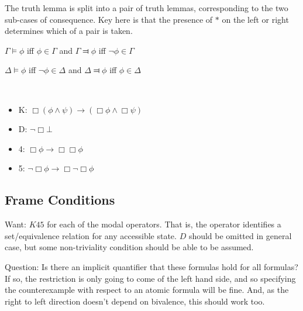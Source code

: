 \documentclass[10pt]{article}
\begin{document}
The truth lemma is split into a pair of truth lemmas, corresponding to the two sub-cases of consequence.
Key here is that the presence of \(\ast\) on the left or right determines which of a pair is taken.



\begin{lemma}
  \(\Gamma \vDash \phi\) iff \(\phi \in \Gamma\) and \(\Gamma \Dashv \phi\) iff \(\lnot\phi \in \Gamma\)
\end{lemma}

\begin{lemma}
  \(\Delta \vDash \phi\) iff \(\lnot\phi \in \Delta\) and \(\Delta \Dashv \phi\) iff \(\phi \in \Delta\)
\end{lemma}


\newpage


\begin{definition}\mbox{ }
  \begin{itemize}
  \item K: \(\Box(\phi \land \psi) \rightarrow (\Box\phi \land \Box\psi)\)
  \item D: \(\lnot\Box\bot\)
  \item 4: \(\Box\phi \rightarrow \Box\Box\phi\)
  \item 5: \(\lnot\Box\phi \rightarrow \Box\lnot\Box\phi\)
  \end{itemize}
\end{definition}

\subsection{Frame Conditions}
\label{sec:frame-conditions}

Want: \(K45\) for each of the modal operators.
That is, the operator identifies a set/equivalence relation for any accessible state.
\(D\) should be omitted in general case, but some non-triviality condition should be able to be assumed.

{\color{red} Question: Is there an implicit quantifier that these formulas hold for all formulas?
  If so, the restriction is only going to come of the left hand side, and so specifying the counterexample with respect to an atomic formula will be fine.
And, as the right to left direction doesn't depend on bivalence, this should work too.}
\end{document}
